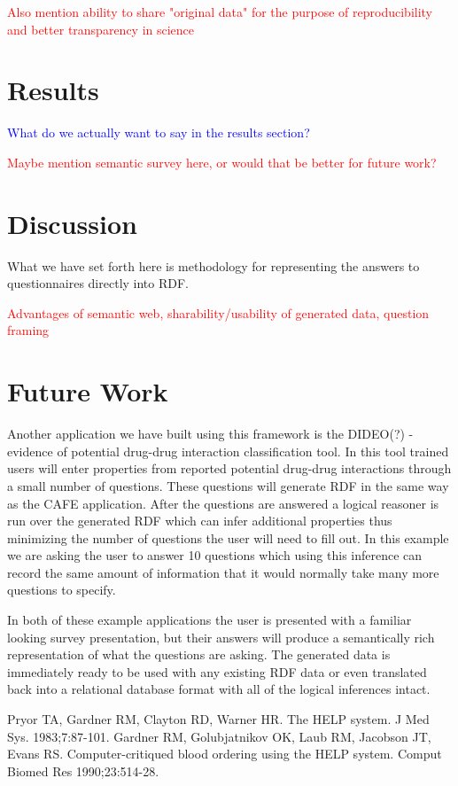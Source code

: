 \documentclass{amia}
\begin{document}
\textcolor{red}{Also mention ability to share "original data" for the purpose of reproducibility and better transparency in science}

\section*{Results}
\textcolor{blue}{What do we actually want to say in the results section?}

\textcolor{red}{Maybe mention semantic survey here, or would that be better for future work?}

\section*{Discussion}
What we have set forth here is methodology for representing the answers to questionnaires directly into RDF.

\textcolor{red}{Advantages of semantic web, sharability/usability of generated data, question framing}

\section*{Future Work}
Another application we have built using this framework is the DIDEO(?) - evidence of potential drug-drug interaction classification tool.
In this tool trained users will enter properties from reported potential drug-drug interactions through a small number of questions.
These questions will generate RDF in the same way as the CAFE application.
After the questions are answered a logical reasoner is run over the generated RDF which can infer additional properties thus minimizing the number of questions the user will need to fill out.
In this example we are asking the user to answer 10 questions which using this inference can record the same amount of information that it would normally take many more questions to specify.

In both of these example applications the user is presented with a familiar looking survey presentation, but their answers will produce a semantically rich representation of what the questions are asking.  The generated data is immediately ready to be used with any existing RDF data or even translated back into a relational database format with all of the logical inferences intact.


\makeatletter
\renewcommand{\@biblabel}[1]{\hfill #1.}
\makeatother


\begin{thebibliography}{1}
\setlength\itemsep{-0.1em}

Pryor TA, Gardner RM, Clayton RD, Warner HR. The HELP system. J Med Sys. 1983;7:87-101.
Gardner RM, Golubjatnikov OK, Laub RM, Jacobson JT, Evans RS. Computer-critiqued blood ordering using the HELP system. Comput Biomed Res 1990;23:514-28.

\end{thebibliography}
\end{document}
